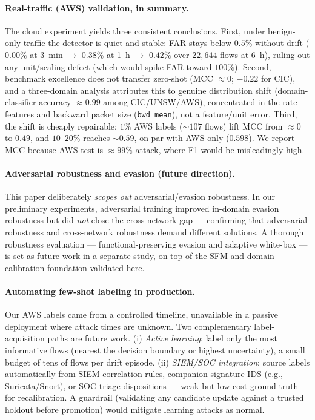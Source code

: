 \documentclass[preprint,12pt,authoryear]{elsarticle}
\begin{document}
\paragraph{Real-traffic (AWS) validation, in summary.} The cloud experiment yields
three consistent conclusions. First, under benign-only traffic the detector is
quiet and stable: FAR stays below $0.5\%$ without drift ($0.00\%$ at 3~min
$\rightarrow$ $0.38\%$ at 1~h $\rightarrow$ $0.42\%$ over $22{,}644$ flows at 6~h),
ruling out any unit/scaling defect (which would spike FAR toward $100\%$). Second,
benchmark excellence does not transfer zero-shot (MCC $\approx 0$; $-0.22$ for CIC),
and a three-domain analysis attributes this to genuine distribution shift
(domain-classifier accuracy $\approx 0.99$ among CIC/UNSW/AWS), concentrated in the
rate features and backward packet size (\texttt{bwd\_mean}), not a feature/unit
error. Third, the shift is cheaply repairable: $1\%$ AWS labels ($\sim$$107$ flows)
lift MCC from $\approx 0$ to $0.49$, and $10$--$20\%$ reaches $\sim 0.59$, on par
with AWS-only ($0.598$). We report MCC because AWS-test is $\approx 99\%$ attack,
where F1 would be misleadingly high.

\paragraph{Adversarial robustness and evasion (future direction).} This paper
deliberately \emph{scopes out} adversarial/evasion robustness. In our preliminary
experiments, adversarial training improved in-domain evasion robustness but did
\emph{not} close the cross-network gap --- confirming that adversarial-robustness
and cross-network robustness demand different solutions. A thorough robustness
evaluation --- functional-preserving evasion and adaptive white-box --- is set as
future work in a separate study, on top of the SFM and domain-calibration
foundation validated here.

\paragraph{Automating few-shot labeling in production.} Our AWS labels came from a
controlled timeline, unavailable in a passive deployment where attack times are
unknown. Two complementary label-acquisition paths are future work. (i) \emph{Active
learning}: label only the most informative flows (nearest the decision boundary or
highest uncertainty), a small budget of tens of flows per drift episode. (ii)
\emph{SIEM/SOC integration}: source labels automatically from SIEM correlation
rules, companion signature IDS (e.g., Suricata/Snort), or SOC triage dispositions
--- weak but low-cost ground truth for recalibration. A guardrail (validating any
candidate update against a trusted holdout before promotion) would mitigate learning
attacks as normal.
\end{document}
